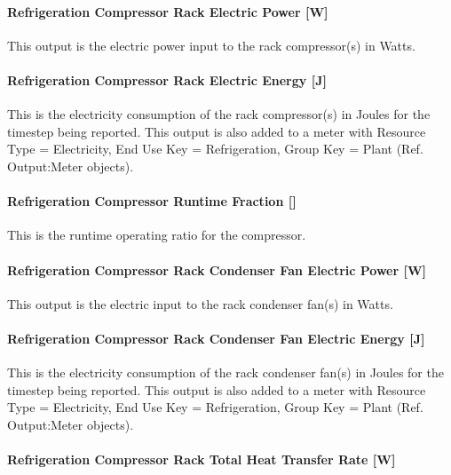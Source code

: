 \paragraph{Refrigeration Compressor Rack Electric Power {[}W{]}}\label{refrigeration-compressor-rack-electric-power-w}

This output is the electric power input to the rack compressor(s) in Watts.

\paragraph{Refrigeration Compressor Rack Electric Energy {[}J{]}}\label{refrigeration-compressor-rack-electric-energy-j}

This is the electricity consumption of the rack compressor(s) in Joules for the timestep being reported. This output is also added to a meter with Resource Type = Electricity, End Use Key = Refrigeration, Group Key = Plant (Ref. Output:Meter objects).

\paragraph{Refrigeration Compressor Runtime Fraction {[]}}\label{refrigeration-compressor-runtime-fraction}

This is the runtime operating ratio for the compressor.

\paragraph{Refrigeration Compressor Rack Condenser Fan Electric Power {[}W{]}}\label{refrigeration-compressor-rack-condenser-fan-electric-power-w}

This output is the electric input to the rack condenser fan(s) in Watts.

\paragraph{Refrigeration Compressor Rack Condenser Fan Electric Energy {[}J{]}}\label{refrigeration-compressor-rack-condenser-fan-electric-energy-j}

This is the electricity consumption of the rack condenser fan(s) in Joules for the timestep being reported. This output is also added to a meter with Resource Type = Electricity, End Use Key = Refrigeration, Group Key = Plant (Ref. Output:Meter objects).

\paragraph{Refrigeration Compressor Rack Total Heat Transfer Rate {[}W{]}}\label{refrigeration-compressor-rack-total-heat-transfer-rate-w}

